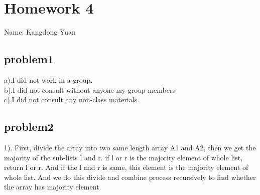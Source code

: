 \documentclass[11pt]{article}
\begin{document}
\section{Homework 4}
Name: Kangdong Yuan
	
\subsection{problem1}
a).I did not work in a group.
\\b).I did not consult without anyone my group members
\\c).I did not consult any non-class materials.

\subsection{problem2}
1). First, divide the array into two same length array A1 and A2, then we get the majority of the sub-lists l and r. if l or r is the majority element of whole list, return l or r. And if the l and r is same, this element is the majority element of whole list. And we do this divide and combine process recursively to find whether the array has majority element. 
\end{document}

